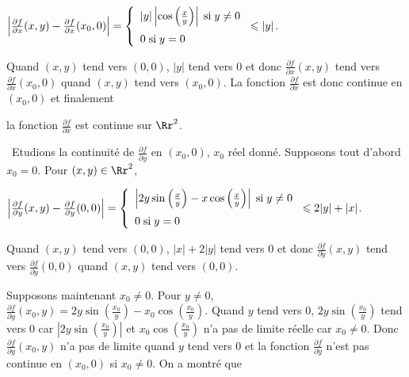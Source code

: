 {{\begin{center}
$\left| \frac{\partial f}{\partial x}(x,y)- \frac{\partial f}{\partial x}(x_0,0)\right|=\left\{
\begin{array}{l}
|y|\left|\cos\left( \frac{x}{y}\right)\right|\;\text{si}\;y\neq0\\
\rule{0mm}{5mm}0\;\text{si}\;y=0
\end{array}
\right.\leqslant|y|$.
\end{center}

Quand $(x,y)$ tend vers $(0,0)$, $|y|$ tend vers $0$ et donc $ \frac{\partial f}{\partial x}(x,y)$ tend vers $ \frac{\partial f}{\partial x}(x_0,0)$ quand $(x,y)$ tend vers $(x_0,0)$. La fonction $ \frac{\partial f}{\partial x}$ est donc continue en $(x_0,0)$ et finalement

\begin{center}
la fonction $ \frac{\partial f}{\partial x}$ est continue sur $\Rr^2$.
\end{center}

\textbullet~Etudions la continuité de $ \frac{\partial f}{\partial y}$ en $(x_0,0)$, $x_0$ réel donné. Supposons tout d'abord $x_0=0$. Pour $(x,y)\in\Rr^2$,

\begin{center}
$\left| \frac{\partial f}{\partial y}(x,y)- \frac{\partial f}{\partial y}(0,0)\right|=\left\{
\begin{array}{l}
\left|2y\sin\left( \frac{x}{y}\right)-x\cos\left( \frac{x}{y}\right)\right|\;\text{si}\;y\neq0\\
\rule{0mm}{5mm}0\;\text{si}\;y=0
\end{array}
\right.\leqslant2|y|+|x|$.
\end{center}

Quand $(x,y)$ tend vers $(0,0)$, $|x|+2|y|$ tend vers $0$ et donc $ \frac{\partial f}{\partial y}(x,y)$ tend vers $ \frac{\partial f}{\partial y}(0,0)$ quand $(x,y)$ tend vers $(0,0)$. 

Supposons maintenant $x_0\neq0$. Pour $y\neq0$, $ \frac{\partial f}{\partial y}(x_0,y)=2y\sin\left( \frac{x_0}{y}\right)-x_0\cos\left( \frac{x_0}{y}\right)$. Quand $y$ tend vers $0$, $2y\sin\left( \frac{x_0}{y}\right)$ tend vers $0$ car $\left|2y\sin\left( \frac{x_0}{y}\right)\right|$ et $x_0\cos\left( \frac{x_0}{y}\right)$ n'a pas de limite réelle car $x_0\neq0$. Donc $ \frac{\partial f}{\partial y}(x_0,y)$ n'a pas de limite quand $y$ tend vers $0$ et la fonction $ \frac{\partial f}{\partial y}$ n'est pas continue en $(x_0,0)$ si $x_0\neq0$. On a montré que

}}
